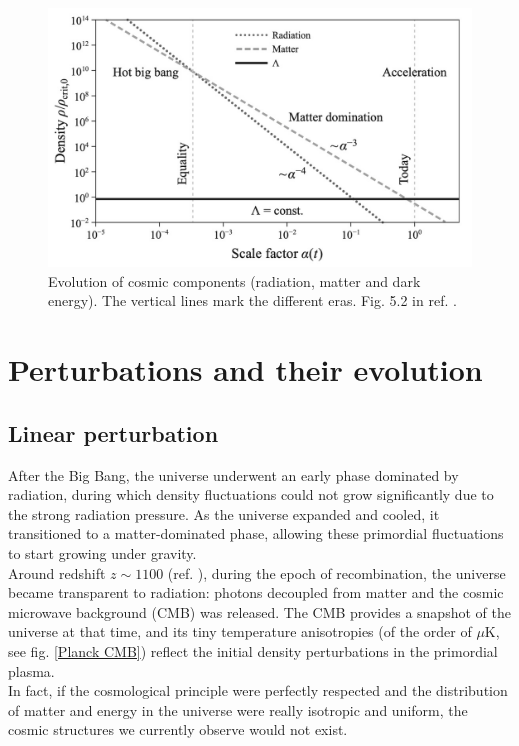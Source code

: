 \begin{figure}[h!]
\centering
    \includegraphics[width=0.62\linewidth]{Images/Chapter1/Evolution of elements in universe.jpeg}
    \caption[Evolution of cosmic components]{Evolution of cosmic components (radiation, matter and dark energy). The vertical lines mark the different eras. Fig. 5.2 in ref. \cite{2024darkmatter}.}
\label{Evolution of cosmic components}
\end{figure}

\section{Perturbations and their evolution}

\subsection{Linear perturbation}
After the Big Bang, the universe underwent an early phase dominated by radiation, during which density fluctuations could not grow significantly due to the strong radiation pressure. As the universe expanded and cooled, it transitioned to a matter-dominated phase, allowing these primordial fluctuations to start growing under gravity.\\
Around redshift $z \sim 1100$ (ref. \cite{2024darkmatter}), during the epoch of recombination, the universe became transparent to radiation: photons decoupled from matter and the cosmic microwave background (CMB) was released. The CMB provides a snapshot of the universe at that time, and its tiny temperature anisotropies (of the order of $\mu$K, see fig. \ref{Planck CMB}) reflect the initial density perturbations in the primordial plasma.\\
In fact, if the cosmological principle were perfectly respected and the distribution of matter and energy in the universe were really isotropic and uniform, the cosmic structures we currently observe would not exist.

